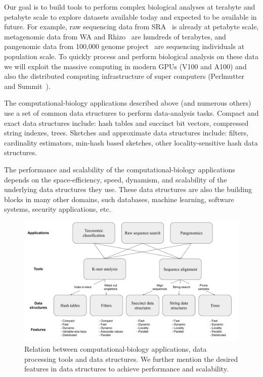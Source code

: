 Our goal is to build tools to perform complex biological analyses at terabyte and petabyte scale to explore datasets available today and expected to be available in future. For example, raw sequencing data from SRA~\cite{kodama2012sequence} is already at petabyte scale, metagenomic data from WA and Rhizo~\cite{hofmeyr2020terabase} are hundreds of terabytes, and pangenomic data from 100,000 genome project~\cite{1002021100} are sequencing individuals at population scale. To quickly process and perform biological analysis on these data we will exploit the massive computing in modern GPUs (V100 and A100) and also the distributed computing infrastructure of super computers (Perlmutter~\cite{perlmutter} and Summit~\cite{summit}).




The computational-biology applications described above (and numerous others)  use a set of common data structures to perform data-analysis tasks.
Compact and exact data structures include: hash tables and succinct bit vectors, compressed string indexes, trees.
Sketches and approximate data structures include: filters, cardinality estimators,  min-hash based sketches, other locality-sensitive hash data structures.

The performance and scalability of the computational-biology applications
depends on the space-efficiency, speed, dynamism, and scalability of the
underlying data structures they use. These data structures are also the building
blocks in many other domains, such databases, machine learning, software
systems, security applications, etc.


\begin{figure}
\centering
\includegraphics[width=1.0\textwidth]{images/PPOSS_App_DS}
\caption{Relation between computational-biology applications, data processing tools and data structures. We further mention the desired features in data structures to achieve performance and scalability.}
\label{fig1}
\end{figure}


